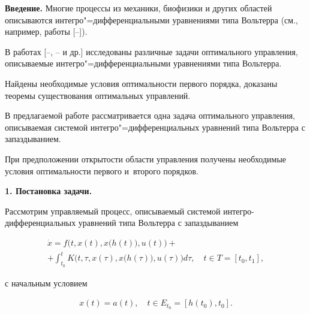 \vspace{5mm}




\makerutitle











\textbf{Введение.} Многие процессы из механики, биофизики и других областей описываются интегро"=дифференциальными уравнениями типа Вольтерра (см., например, работы [--]).



В работах [--, -- и др.] исследованы различные задачи оптимального управления, описываемые интегро"=дифференциальными уравнениями типа Вольтерра. 

Найдены необходимые условия оптимальности первого порядка, доказаны теоремы существования оптимальных управлений.



В предлагаемой работе рассматривается одна задача оптимального управления, описываемая системой интегро"=дифференциальных уравнений типа Вольтерра с запаздыванием. 

При предположении открытости области управления получены необходимые условия оптимальности первого и~второго порядков.



\smallskip





 \textbf{1. Постановка задачи.} 

Рассмотрим управляемый процесс, описываемый системой интегро-дифференциальных уравнений типа Вольтерра с запаздыванием

\begin{multline}

\dot x=f \bigl(t, x(t), x\bigl(h(t)\bigr), u(t) \bigr)+ \\ +

\int_{t_{0}}^{t} K \bigl(t, \tau, x(\tau), x\bigl(h(\tau) \bigr), u(\tau) \bigr) d\tau , \quad t\in T = [ t_{0}, t_{1}] ,

\label{mans:eq1}

\end{multline}

с начальным условием

\begin{gather}

\label{mans:eq2}

x(t)=a(t), \quad  t\in E_{t_{0}}= [ h(t_{0}), t_{0}  ] .

\end{gather}

